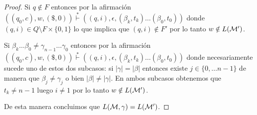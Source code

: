 \documentclass[tesis.tex]{subfiles}
\begin{document}
\begin{proof}
	Si $q \notin F$ entonces por la afirmación $((q_0,c), w, (\$,0)) \overset{*}{\vdash} ((q,i), \epsilon, (\beta_k, t_k)\dots (\beta_0,t_0))$ donde $(q,i) \in Q \setminus F \times \{ 0,1 \}$ lo que implica que $(q,i) \notin F'$ por lo tanto $w \notin L({\cal M}')$.

	Si $\beta_{k} \dots \beta_{0} \neq \gamma_{n-1} \dots \gamma_{0}$ entonces por la afirmación $((q_0,c), w, (\$,0)) \overset{*}{\vdash} ((q,i), \epsilon, (\beta_k, t_k)\dots (\beta_0,t_0))$ donde necesariamente sucede uno de estos dos subcasos: si $|\gamma| = |\beta|$ entonces 
	existe $j \in \{ 0, \dots n-1 \}$ de manera que $\beta_j \neq \gamma_{j}$
	o bien $|\beta| \neq |\gamma|$.
	En ambos subcasos obtenemos que $t_{k} \neq n-1$ luego 
	$i \neq 1$ por lo tanto $w \notin L({\cal M}')$.

	

	De esta manera concluimos que $L({\cal M}, \gamma) = L(\cal M ')$.
	

	
	
	
	
	
	
\end{proof}
\end{document}
